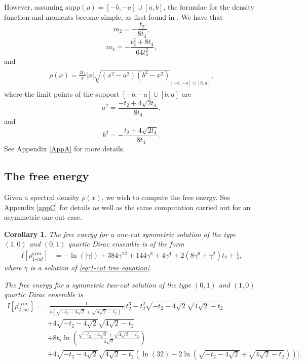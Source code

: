 \documentclass[10pt]{article}
\theoremstyle{plain}
\newtheorem{corollary}[theorem]{Corollary}
\theoremstyle{definition}
\theoremstyle{plain}
\begin{document}
However, assuming $\text{supp}(\rho) = [-b,-a]\cup [a,b]$, the formulae for the density function and moments become simple, as first found in \cite{khalkhali2020phase}. We have that
$$m_{2} =-\frac{t_{2}}{8t_{4}},$$
$$m_{4} = -\frac{t_{2}^2+ 8t_{4}}{64 t_{4}^{2}},$$
and
\begin{align*}
\begin{split}
\rho(x) = \frac{4t_{4}}{\pi}|x| \sqrt{(x^{2}-a^{2})(b^{2}-x^{2})}_{[-b,-a]\cup [b,a]},
\end{split}
\end{align*}
where the limit points of the support $[-b,-a]\cup [b,a]$ are
\begin{equation*}\label{a in terms of g}
a^{2}= \frac{-t_{2}+ 4 \sqrt{2t_{4}}}{8t_{4}},
\end{equation*}
and 
\begin{equation*}\label{b in terms of g}
b^{2}= -\frac{t_{2}+ 4 \sqrt{2t_{4}}}{8t_{4}}.
\end{equation*}
See Appendix \ref{AppA} for more details.


\subsection{The free energy}
Given a spectral density $\rho(x)$, we wish to compute the free energy. See Appendix \ref{appC} for details as well as the same computation carried out for an asymmetric one-cut case. 



\begin{corollary}
\label{cor: sym free energy}
 The free energy for a one-cut symmetric solution of the type $(1,0)$ and $(0,1)$ quartic Dirac ensemble is of the form 
 \begin{align*}
 I[\rho_{\textit{1-cut}}^{\text{sym}}] &= -\ln (| \gamma | )+384 \gamma ^{12}+144 \gamma ^8+4 \gamma ^4+2 \left(8 \gamma ^6+\gamma ^2\right) t_{2}+\frac{1}{2},
 \end{align*}
 where $\gamma$ is a solution of \eqref{eq:1-cut tree equation}.

 The free energy for a symmetric two-cut solution of the type $(0,1)$ and $(1,0)$ quartic Dirac ensemble is 
 \begin{align*}
 I[\rho_{\text{2-cut}}^{\text{sym}}]=&\ \frac{1}{{4
 \left(\sqrt{-t_{2}-4 \sqrt{2}}+\sqrt{4 \sqrt{2}-t_{2}}\right)^2}}\bigg[t_{2}^3-t_{2}^2\sqrt{-t_{2}-4 \sqrt{2}} \sqrt{4 \sqrt{2}-t_{2}} \\
 &\left.+4
 \sqrt{-t_{2}-4 \sqrt{2}} \sqrt{4 \sqrt{2}-t_{2}}\right.\\
 &+8 t_{2} \ln
 \left(\frac{\sqrt{-t_{2}-4 \sqrt{2}}+\sqrt{4 \sqrt{2}-t_{2}}}{4 \sqrt{2}}\right)\\
 &+4
 \sqrt{-t_{2}-4 \sqrt{2}} \sqrt{4 \sqrt{2}-t_{2}} \left(\ln (32)-2 \ln
 \left(\sqrt{-t_{2}-4 \sqrt{2}}+\sqrt{4 \sqrt{2}-t_{2}}\right)\right)\bigg].
 \end{align*}
\end{corollary}
\end{document}
